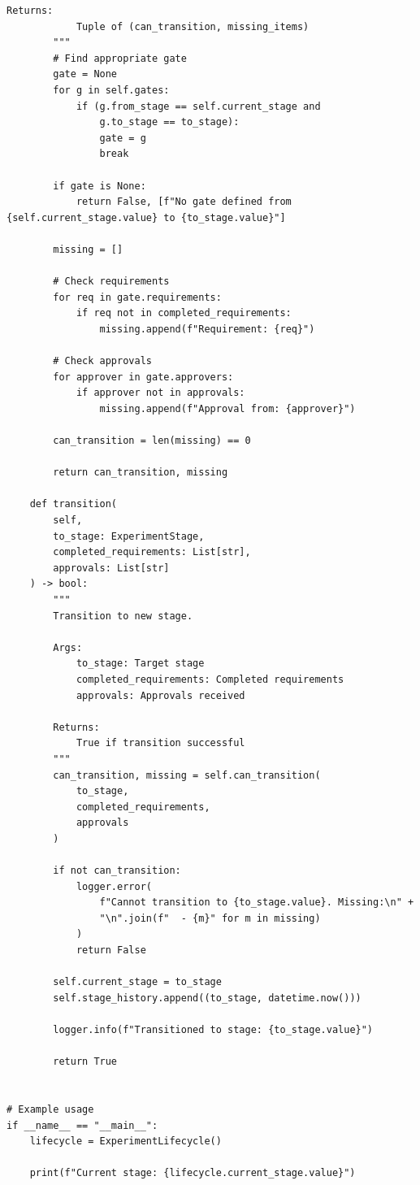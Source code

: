 \begin{lstlisting}[style=python, caption={Experiment lifecycle management}]
        Returns:
            Tuple of (can_transition, missing_items)
        """
        # Find appropriate gate
        gate = None
        for g in self.gates:
            if (g.from_stage == self.current_stage and
                g.to_stage == to_stage):
                gate = g
                break

        if gate is None:
            return False, [f"No gate defined from {self.current_stage.value} to {to_stage.value}"]

        missing = []

        # Check requirements
        for req in gate.requirements:
            if req not in completed_requirements:
                missing.append(f"Requirement: {req}")

        # Check approvals
        for approver in gate.approvers:
            if approver not in approvals:
                missing.append(f"Approval from: {approver}")

        can_transition = len(missing) == 0

        return can_transition, missing

    def transition(
        self,
        to_stage: ExperimentStage,
        completed_requirements: List[str],
        approvals: List[str]
    ) -> bool:
        """
        Transition to new stage.

        Args:
            to_stage: Target stage
            completed_requirements: Completed requirements
            approvals: Approvals received

        Returns:
            True if transition successful
        """
        can_transition, missing = self.can_transition(
            to_stage,
            completed_requirements,
            approvals
        )

        if not can_transition:
            logger.error(
                f"Cannot transition to {to_stage.value}. Missing:\n" +
                "\n".join(f"  - {m}" for m in missing)
            )
            return False

        self.current_stage = to_stage
        self.stage_history.append((to_stage, datetime.now()))

        logger.info(f"Transitioned to stage: {to_stage.value}")

        return True


# Example usage
if __name__ == "__main__":
    lifecycle = ExperimentLifecycle()

    print(f"Current stage: {lifecycle.current_stage.value}")


\end{lstlisting}
